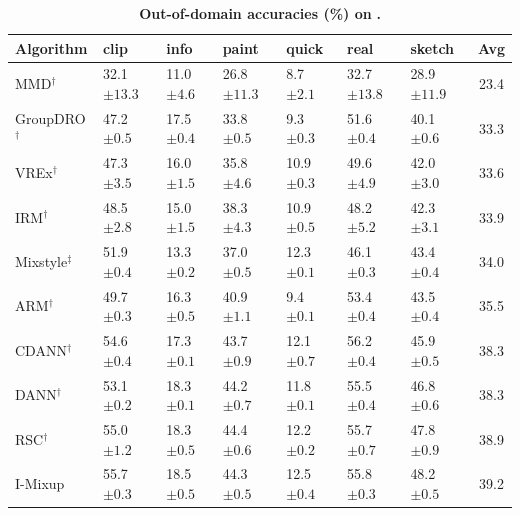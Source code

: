 \begin{table}[htbp]
\centering
\small
\renewcommand{\arraystretch}{1.1}
\caption{\textbf{Out-of-domain accuracies (\%) on} \textbf{.}}
\begin{tabular}{lllllll|c}
\toprule
\textbf{Algorithm} & \textbf{clip} & \textbf{info} & \textbf{paint} & \textbf{quick} & \textbf{real} & \textbf{sketch} & \textbf{Avg} \\
\midrule
MMD$^\dagger$ & 32.1 \scriptsize$\pm13.3$ & 11.0 \scriptsize$\pm4.6$ & 26.8 \scriptsize$\pm11.3$ & 8.7 \scriptsize$\pm2.1$ & 32.7 \scriptsize$\pm13.8$ & 28.9 \scriptsize$\pm11.9$ & 23.4 \\
GroupDRO$^\dagger$ & 47.2 \scriptsize$\pm0.5$ & 17.5 \scriptsize$\pm0.4$ & 33.8 \scriptsize$\pm0.5$ & 9.3 \scriptsize$\pm0.3$ & 51.6 \scriptsize$\pm0.4$ & 40.1 \scriptsize$\pm0.6$ & 33.3 \\
VREx$^\dagger$ & 47.3 \scriptsize$\pm3.5$ & 16.0 \scriptsize$\pm1.5$ & 35.8 \scriptsize$\pm4.6$ & 10.9 \scriptsize$\pm0.3$ & 49.6 \scriptsize$\pm4.9$ & 42.0 \scriptsize$\pm3.0$ & 33.6 \\
IRM$^\dagger$ & 48.5 \scriptsize$\pm2.8$ & 15.0 \scriptsize$\pm1.5$ & 38.3 \scriptsize$\pm4.3$ & 10.9 \scriptsize$\pm0.5$ & 48.2 \scriptsize$\pm5.2$ & 42.3 \scriptsize$\pm3.1$ & 33.9 \\
Mixstyle$^\ddagger$ & 51.9 \scriptsize$\pm0.4$ & 13.3 \scriptsize$\pm0.2$ & 37.0 \scriptsize$\pm0.5$ & 12.3 \scriptsize$\pm0.1$ & 46.1 \scriptsize$\pm0.3$ & 43.4 \scriptsize$\pm0.4$ & 34.0 \\
ARM$^\dagger$ & 49.7 \scriptsize$\pm0.3$ & 16.3 \scriptsize$\pm0.5$ & 40.9 \scriptsize$\pm1.1$ & 9.4 \scriptsize$\pm0.1$ & 53.4 \scriptsize$\pm0.4$ & 43.5 \scriptsize$\pm0.4$ & 35.5 \\
CDANN$^\dagger$ & 54.6 \scriptsize$\pm0.4$ & 17.3 \scriptsize$\pm0.1$ & 43.7 \scriptsize$\pm0.9$ & 12.1 \scriptsize$\pm0.7$ & 56.2 \scriptsize$\pm0.4$ & 45.9 \scriptsize$\pm0.5$ & 38.3 \\
DANN$^\dagger$ & 53.1 \scriptsize$\pm0.2$ & 18.3 \scriptsize$\pm0.1$ & 44.2 \scriptsize$\pm0.7$ & 11.8 \scriptsize$\pm0.1$ & 55.5 \scriptsize$\pm0.4$ & 46.8 \scriptsize$\pm0.6$ & 38.3 \\
RSC$^\dagger$ & 55.0 \scriptsize$\pm1.2$ & 18.3 \scriptsize$\pm0.5$ & 44.4 \scriptsize$\pm0.6$ & 12.2 \scriptsize$\pm0.2$ & 55.7 \scriptsize$\pm0.7$ & 47.8 \scriptsize$\pm0.9$ & 38.9 \\
I-Mixup & 55.7 \scriptsize$\pm0.3$ & 18.5 \scriptsize$\pm0.5$ & 44.3 \scriptsize$\pm0.5$ & 12.5 \scriptsize$\pm0.4$ & 55.8 \scriptsize$\pm0.3$ & 48.2 \scriptsize$\pm0.5$ & 39.2 \\

\end{tabular}
\end{table}
